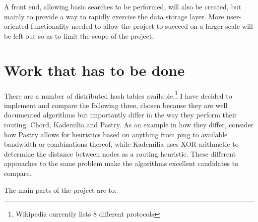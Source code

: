 A front end, allowing basic searches to be performed, will also be created, but mainly to provide a way to rapidly exercise the data storage layer. More user-oriented functionality needed to allow the project to succeed on a larger scale will be left out so as to limit the scope of the project.

\section*{Work that has to be done}

There are a number of distributed hash tables available.\footnote{ Wikipedia currently lists 8 different protocols } I have decided to implement and compare the following three, chosen because they are well documented algorithms but importantly differ in the way they perform their routing: Chord, Kademilia and Pastry. As an example in how they differ, consider how Pastry allows for heuristics based on anything from ping to available bandwidth or combinations thereof, while Kademilia uses XOR arithmetic to determine the distance between nodes as a routing heuristic. These different approaches to the same problem make the algorithms excellent candidates to compare.

The main parts of the project are to:

